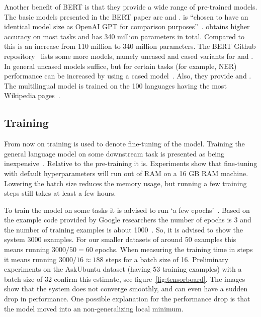 Another benefit of BERT is that they provide a wide range of pre-trained models.
The basic models presented in the BERT paper are  and .
 is ``chosen to have an identical model size as OpenAI GPT for comparison purposes''~\citep{devlin2018}.
 obtains higher accuracy on most tasks and has 340 million parameters in total.
Compared to  this is an increase from 110 million to 340 million parameters.
The BERT Github repository~\citep{devlin2018github} lists some more models, namely uncased and cased variants for  and .
In general uncased models suffice, but for certain tasks (for example, NER) performance can be increased by using a cased model~\citep{devlin2018github}.
Also, they provide  and .
The multilingual model is trained on the 100 languages having the most Wikipedia pages~\citep{devlin2019multi}.

\subsection{Training}
\label{subsec:training}
From now on training is used to denote fine-tuning of the model.
Training the general language model on some downstream task is presented as being inexpensive~\citep{devlin2018github}.
Relative to the pre-training it is.
Experiments show that fine-tuning with default hyperparameters will run out of RAM on a 16 GB RAM machine.
Lowering the batch size reduces the memory usage, but running a few training steps still takes at least a few hours.

To train the model on some tasks it is advised to run `a few epochs'~\citep{devlin2018github}.
Based on the example code provided by Google researchers the number of epochs is 3 and the number of training examples is about 1000~\citep{bajaj2018}.
So, it is advised to show the system $3000$ examples.
For our smaller datasets of around 50 examples this means running $3000 / 50 = 60$ epochs.
When measuring the training time in steps it means running $3000 / 16 \approx 188$ steps for a batch size of 16.
Preliminary experiments on the AskUbuntu dataset (having 53 training examples) with a batch size of 32 confirm this estimate, see figure~\ref{fig:tensorboard}.
The images show that the system does not converge smoothly, and can even have a sudden drop in performance.
One possible explanation for the performance drop is that the model moved into an non-generalizing local minimum.

